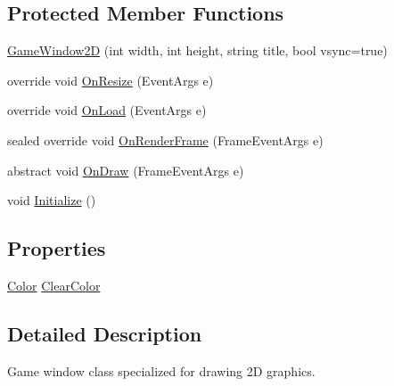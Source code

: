 \subsection*{Protected Member Functions}
\begin{DoxyCompactItemize}
\item 
\hyperlink{class_tri_devs_1_1_tri_engine_1_1_game_window2_d_adab390dc8d20c7e97a5250dae2ba5eb5}{Game\-Window2\-D} (int width, int height, string title, bool vsync=true)
\item 
override void \hyperlink{class_tri_devs_1_1_tri_engine_1_1_game_window2_d_ae0d49eb7998763deb93494e4611dd595}{On\-Resize} (Event\-Args e)
\item 
override void \hyperlink{class_tri_devs_1_1_tri_engine_1_1_game_window2_d_a0b4bcb7122b225d8d1d3c8555eb9b96f}{On\-Load} (Event\-Args e)
\item 
sealed override void \hyperlink{class_tri_devs_1_1_tri_engine_1_1_game_window2_d_a6c67dcfa77a3cc0f3791ecd558de715a}{On\-Render\-Frame} (Frame\-Event\-Args e)
\item 
abstract void \hyperlink{class_tri_devs_1_1_tri_engine_1_1_game_window2_d_ace56fccc2852d47e7cba0e4469c282fe}{On\-Draw} (Frame\-Event\-Args e)
\item 
void \hyperlink{class_tri_devs_1_1_tri_engine_1_1_game_window2_d_a64a153dc9c2cb227dc0404924e532012}{Initialize} ()
\end{DoxyCompactItemize}
\subsection*{Properties}
\begin{DoxyCompactItemize}
\item 
\hyperlink{struct_tri_devs_1_1_tri_engine_1_1_color}{Color} \hyperlink{class_tri_devs_1_1_tri_engine_1_1_game_window2_d_a6f526984765fe29865ec4d996099dbe5}{Clear\-Color}
\end{DoxyCompactItemize}


\subsection{Detailed Description}
Game window class specialized for drawing 2\-D graphics. 



